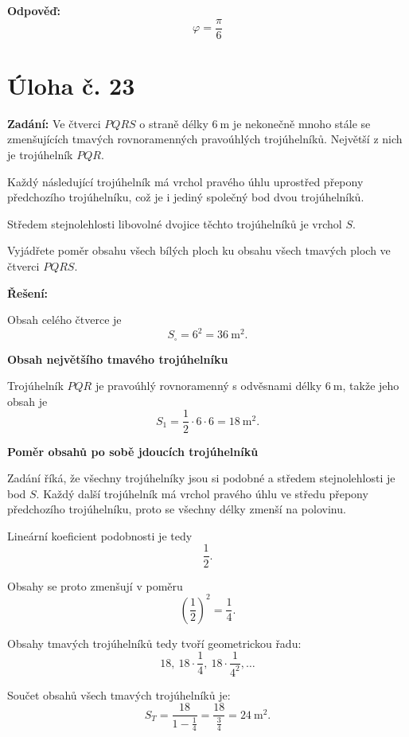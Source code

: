 \documentclass[12pt,a4paper]{article}
\begin{document}
\bigskip

\textbf{Odpověď:}  
\[
\boxed{\varphi=\frac{\pi}{6}}
\]



\newpage
\section*{Úloha č. 23}

\textbf{Zadání:}  
Ve čtverci \(PQRS\) o straně délky \(6\ \mathrm{m}\) je nekonečně mnoho stále se zmenšujících tmavých rovnoramenných pravoúhlých trojúhelníků. Největší z nich je trojúhelník \(PQR\).

Každý následující trojúhelník má vrchol pravého úhlu uprostřed přepony předchozího trojúhelníku, což je i jediný společný bod dvou trojúhelníků.

Středem stejnolehlosti libovolné dvojice těchto trojúhelníků je vrchol \(S\).

Vyjádřete poměr obsahu všech bílých ploch ku obsahu všech tmavých ploch ve čtverci \(PQRS\).

\bigskip

\textbf{Řešení:}

Obsah celého čtverce je
\[
S_{\square}=6^2=36\ \mathrm{m}^2.
\]

\medskip

\textbf{Obsah největšího tmavého trojúhelníku}

Trojúhelník \(PQR\) je pravoúhlý rovnoramenný s odvěsnami délky \(6\ \mathrm{m}\), takže jeho obsah je
\[
S_1=\frac12\cdot 6\cdot 6=18\ \mathrm{m}^2.
\]

\medskip

\textbf{Poměr obsahů po sobě jdoucích trojúhelníků}

Zadání říká, že všechny trojúhelníky jsou si podobné a středem stejnolehlosti je bod \(S\).  
Každý další trojúhelník má vrchol pravého úhlu ve středu přepony předchozího trojúhelníku, proto se všechny délky zmenší na polovinu.

Lineární koeficient podobnosti je tedy
\[
\frac12.
\]

Obsahy se proto zmenšují v poměru
\[
\left(\frac12\right)^2=\frac14.
\]

Obsahy tmavých trojúhelníků tedy tvoří geometrickou řadu:
\[
18,\ 18\cdot\frac14,\ 18\cdot\frac{1}{4^2},\dots
\]

Součet obsahů všech tmavých trojúhelníků je:
\[
S_T=\frac{18}{1-\frac14}
=\frac{18}{\frac34}
=24\ \mathrm{m}^2.
\]
\end{document}

